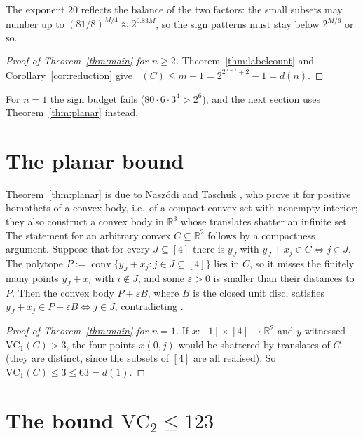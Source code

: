 \documentclass[11pt,a4paper]{article}
\theoremstyle{plain}
\theoremstyle{definition}
\DeclareMathOperator{\conv}{conv}
\DeclareMathOperator{\VCn}{\mathrm{VC}_n}
\newcommand{\R}{\mathbb{R}}
\begin{document}
The exponent $20$ reflects the balance of the two factors: the small subsets may number up to
$(81/8)^{M/4}\approx2^{0.83M}$, so the sign patterns must stay below $2^{M/6}$ or so.

\begin{proof}[Proof of Theorem~\ref{thm:main} for $n\ge2$]
Theorem~\ref{thm:labelcount} and Corollary~\ref{cor:reduction} give
$\VCn(C)\le m-1=2^{2^{n+1}+2}-1=d(n)$.
\end{proof}

For $n=1$ the sign budget fails ($80\cdot6\cdot3^{4}>2^{6}$), and the next section uses
Theorem~\ref{thm:planar} instead.

\section{The planar bound}\label{sec:planar}

Theorem~\ref{thm:planar} is due to Naszódi and Taschuk \cite[Theorem~3]{naszoditaschuk}, who
prove it for positive homothets of a convex body, i.e.\ of a compact convex set with nonempty
interior; they also construct a convex body in $\R^{3}$ whose translates shatter an infinite
set. The statement for an arbitrary convex $C\subseteq\R^{2}$ follows by a compactness
argument. Suppose that for every $J\subseteq[4]$ there is $y_J$ with $y_J+x_j\in C\iff j\in J$.
The polytope $P:=\conv\{y_J+x_j:j\in J\subseteq[4]\}$ lies in $C$, so it misses the finitely many
points $y_J+x_i$ with $i\notin J$, and some $\varepsilon>0$ is smaller than their distances to
$P$. Then the convex body $P+\varepsilon B$, where $B$ is the closed unit disc, satisfies
$y_J+x_j\in P+\varepsilon B\iff j\in J$, contradicting \cite[Theorem~3]{naszoditaschuk}.

\begin{proof}[Proof of Theorem~\ref{thm:main} for $n=1$]
If $x\colon[1]\times[4]\to\R^{2}$ and $y$ witnessed $\mathrm{VC}_1(C)>3$, the four points
$x(0,j)$ would be shattered by translates of $C$ (they are distinct, since the subsets of $[4]$
are all realised). So $\mathrm{VC}_1(C)\le3\le63=d(1)$.
\end{proof}

\section{The bound \texorpdfstring{$\mathrm{VC}_2\le123$}{VC2 <= 123}}\label{sec:three}
\end{document}
